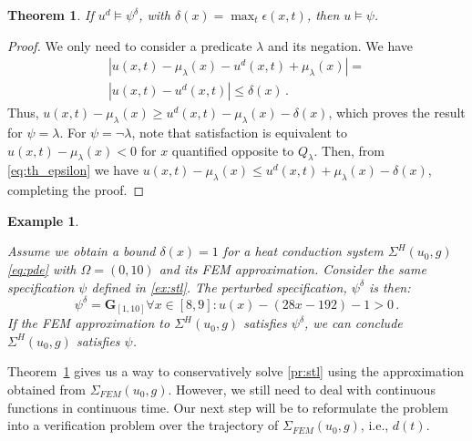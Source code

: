 \documentclass[letterpaper, 10 pt, conference]{ieeeconf/ieeeconf}
\newtheorem{theorem}{Theorem}
\newtheorem{example}{Example}
\newcommand{\Always}{\mathbf{G}}
\begin{document}
\begin{theorem}
\label{th:epsilon_approximation}
    If $u^d \models \psi^{\delta}$, with $\delta(x) = \max_t \epsilon(x, t)$, then $u \models \psi$.
\end{theorem}
\begin{proof}
    We only need to consider a predicate $\lambda$ and its negation. We have
    \begin{multline}
        \label{eq:th_epsilon}
         |u(x, t) - \mu_\lambda(x) - u^d(x, t) + \mu_\lambda(x)| = \\
         |u(x, t) - u^d(x, t)| \leq \delta(x) \,.
    \end{multline}
    Thus, $u(x, t) - \mu_\lambda(x) \geq u^d(x, t) -
    \mu_\lambda(x) - \delta(x)$, which proves the result for $\psi = \lambda$. For $\psi
    = \lnot \lambda$, note that satisfaction is equivalent to $u(x, t) -
    \mu_\lambda(x) < 0$ for $x$ quantified opposite to $Q_\lambda$. Then, from
    \cref{eq:th_epsilon} we have $u(x, t) - \mu_\lambda(x) \leq u^d(x, t) +
    \mu_\lambda(x) - \delta(x)$, completing the proof.
\end{proof}

\begin{example}
    \label{ex:eps_approx}

    Assume we obtain a bound $\delta(x) = 1$ for a heat conduction system
    $\Sigma^H(u_0, g)$ \cref{eq:pde} with $\Omega = (0, 10)$ and its
    FEM approximation. Consider the same specification $\psi$ defined in \cref{ex:stl}.
    The perturbed specification, $\psi^\delta$ is then:
    \begin{equation}
        \psi^\delta = \Always_{[1,10]} \forall x \in [8,9] : u(x) - (28x -
        192) - 1 > 0 \,.
    \end{equation}
    If the FEM approximation to $\Sigma^H(u_0, g)$ satisfies $\psi^\delta$, we can
    conclude $\Sigma^H(u_0, g)$ satisfies $\psi$.
    
\end{example}

Theorem~\ref{th:epsilon_approximation} gives us a way to conservatively solve
\cref{pr:stl} using the approximation obtained from $\Sigma_{FEM}(u_0, g)$.
However, we still need to deal with continuous functions in continuous time. Our
next step will be to reformulate the problem into a verification problem over
the trajectory of $\Sigma_{FEM}(u_0, g)$, i.e., $d(t)$.
\end{document}
